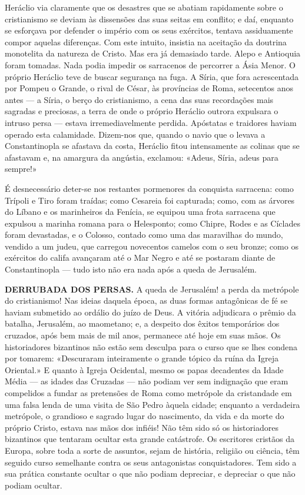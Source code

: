 \documentclass[11pt,a5paper,twoside,openany]{book}
\begin{document}
Heráclio via claramente que os desastres que se abatiam rapidamente sobre o cristianismo se deviam às dissensões das suas seitas em conflito; e daí, enquanto se esforçava por defender o império com os seus exércitos, tentava assiduamente compor aquelas diferenças. Com este intuito, insistia na aceitação da doutrina monotelita da natureza de Cristo. Mas era já demasiado tarde. Alepo e Antioquia foram tomadas. Nada podia impedir os sarracenos de percorrer a Ásia Menor. O próprio Heráclio teve de buscar segurança na fuga. A Síria, que fora acrescentada por Pompeu o Grande, o rival de César, às províncias de Roma, setecentos anos antes — a Síria, o berço do cristianismo, a cena das suas recordações mais sagradas e preciosas, a terra de onde o próprio Heráclio outrora expulsara o intruso persa — estava irremediavelmente perdida. Apóstatas e traidores haviam operado esta calamidade. Dizem-nos que, quando o navio que o levava a Constantinopla se afastava da costa, Heráclio fitou intensamente as colinas que se afastavam e, na amargura da angústia, exclamou: «Adeus, Síria, adeus para sempre!»

É desnecessário deter-se nos restantes pormenores da conquista sarracena: como Trípoli e Tiro foram traídas; como Cesareia foi capturada; como, com as árvores do Líbano e os marinheiros da Fenícia, se equipou uma frota sarracena que expulsou a marinha romana para o Helesponto; como Chipre, Rodes e as Cíclades foram devastadas, e o Colosso, contado como uma das maravilhas do mundo, vendido a um judeu, que carregou novecentos camelos com o seu bronze; como os exércitos do califa avançaram até o Mar Negro e até se postaram diante de Constantinopla — tudo isto não era nada após a queda de Jerusalém.

\textbf{DERRUBADA DOS PERSAS.} A queda de Jerusalém! a perda da metrópole do cristianismo! Nas ideias daquela época, as duas formas antagônicas de fé se haviam submetido ao ordálio do juízo de Deus. A vitória adjudicara o prêmio da batalha, Jerusalém, ao maometano; e, a despeito dos êxitos temporários dos cruzados, após bem mais de mil anos, permanece até hoje em suas mãos. Os historiadores bizantinos não estão sem desculpa para o curso que se lhes condena por tomarem: «Descuraram inteiramente o grande tópico da ruína da Igreja Oriental.» E quanto à Igreja Ocidental, mesmo os papas decadentes da Idade Média — as idades das Cruzadas — não podiam ver sem indignação que eram compelidos a fundar as pretensões de Roma como metrópole da cristandade em uma falsa lenda de uma visita de São Pedro àquela cidade; enquanto a verdadeira metrópole, o grandioso e sagrado lugar do nascimento, da vida e da morte do próprio Cristo, estava nas mãos dos infiéis! Não têm sido só os historiadores bizantinos que tentaram ocultar esta grande catástrofe. Os escritores cristãos da Europa, sobre toda a sorte de assuntos, sejam de história, religião ou ciência, têm seguido curso semelhante contra os seus antagonistas conquistadores. Tem sido a sua prática constante ocultar o que não podiam depreciar, e depreciar o que não podiam ocultar.
\end{document}
